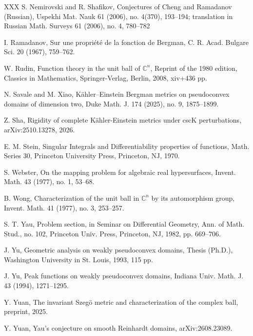\documentclass[a4paper,centertags,oneside,12pt]{amsart}
\numberwithin{equation}{section}
\begin{document}
\begin{thebibliography}{XXX}
  S. Nemirovski and R. Shafikov, Conjectures of Cheng and Ramadanov (Russian), Uspekhi Mat. Nauk 61 (2006), no. 4(370), 193--194; translation in Russian Math. Surveys 61 (2006), no. 4, 780--782

 I. Ramadanov, Sur une propri\'et\'e de la fonction de Bergman, C. R. Acad. Bulgare Sci. 20 (1967), 759--762.

 W. Rudin, Function theory in the unit ball of $\mathbb C^n$, Reprint of the 1980 edition, Classics in Mathematics, Springer-Verlag, Berlin, 2008, xiv+436 pp.

 N. Savale and M. Xiao, K\"ahler--Einstein Bergman metrics on pseudoconvex domains of dimension two, Duke Math. J. 174 (2025), no. 9, 1875--1899.

 Z. Sha, Rigidity of complete K\"ahler-Einstein metrics under cscK perturbations, arXiv:2510.13278, 2026.

 E. M. Stein, Singular Integrals and Differentiability properties of functions, Math. Series 30, Princeton University Press, Princeton, NJ, 1970.

 S. Webster, On the mapping problem for algebraic real hypersurfaces, Invent. Math. 43 (1977), no. 1, 53--68.

 B. Wong, Characterization of the unit ball in $\mathbb{C}^n$ by its automorphism group, Invent. Math. 41 (1977), no. 3, 253--257.

 S. T. Yau, Problem section, in Seminar on Differential Geometry, Ann. of Math. Stud., no. 102, Princeton Univ. Press, Princeton, NJ, 1982, pp. 669--706.

 J. Yu, Geometric analysis on weakly pseudoconvex domains, Thesis (Ph.D.), Washington University in St. Louis, 1993, 115 pp.

 J. Yu, Peak functions on weakly pseudoconvex domains, Indiana Univ. Math. J. 43 (1994), 1271--1295.

 Y. Yuan, The invariant Szeg\"o metric and characterization of the complex ball, preprint, 2025.


 Y. Yuan, Yau's conjecture on smooth Reinhardt domains,  arXiv:2608.23089.
\end{thebibliography}
\end{document}
